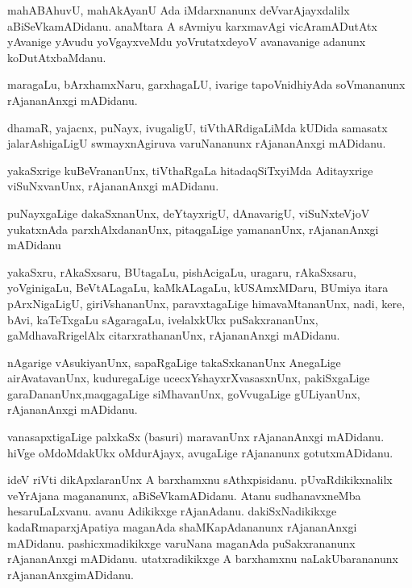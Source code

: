 \documentclass{article}
\begin{document}
\begin{mn}
mahABAhuvU, mahAkAyanU Ada iMdarxnanunx deVvarAjayxdalilx aBiSeVkamADidanu.  
anaMtara A sAvmiyu karxmavAgi vicAramADutAtx yAvanige yAvudu yoVgayxveMdu 
yoVrutatxdeyoV  avanavanige adanunx koDutAtxbaMdanu.
\end{mn}

\begin{mn}
maragaLu, bArxhamxNaru, garxhagaLU,  ivarige tapoVnidhiyAda soVmananunx rAjananAnxgi  mADidanu.
\end{mn}

\begin{mn}
dhamaR, yajacnx, puNayx, ivugaligU,  tiVthARdigaLiMda kUDida samasatx 
jalarAshigaLigU swmayxnAgiruva varuNananunx rAjananAnxgi mADidanu.
\end{mn}

\begin{mn}
yakaSxrige kuBeVrananUnx,  tiVthaRgaLa hitadaqSiTxyiMda  Aditayxrige viSuNxvanUnx, rAjananAnxgi mADidanu.
\end{mn}

\begin{mn}
puNayxgaLige dakaSxnanUnx, deYtayxrigU, dAnavarigU, viSuNxteVjoV yukatxnAda 
parxhAlxdananUnx, pitaqgaLige yamananUnx, rAjananAnxgi mADidanu
\end{mn}

\begin{mn}
yakaSxru, rAkaSxsaru, BUtagaLu, pishAcigaLu, uragaru, rAkaSxsaru, yoVginigaLu, 
BeVtALagaLu, kaMkALagaLu,  kUSAmxMDaru,  BUmiya itara pArxNigaLigU,  
giriVshananUnx, paravxtagaLige himavaMtananUnx, nadi, kere, bAvi, kaTeTxgaLu 
sAgaragaLu, ivelalxkUkx puSakxrananUnx, gaMdhavaRrigelAlx citarxrathananUnx, 
rAjananAnxgi mADidanu.
\end{mn}

\begin{mn}
nAgarige vAsukiyanUnx, sapaRgaLige takaSxkananUnx AnegaLige airAvatavanUnx, 
kuduregaLige ucecxYshayxrXvasasxnUnx, pakiSxgaLige garaDananUnx,maqgagaLige 
siMhavanUnx, goVvugaLige gULiyanUnx, rAjananAnxgi mADidanu.
\end{mn}

\begin{mn}
vanasapxtigaLige palxkaSx (basuri) maravanUnx rAjananAnxgi mADidanu. hiVge 
oMdoMdakUkx oMdurAjayx, avugaLige rAjananunx  gotutxmADidanu. 
\end{mn}

\begin{mn}
ideV riVti dikApxlaranUnx A barxhamxnu sAthxpisidanu. pUvaRdikikxnalilx 
veYrAjana magananunx, aBiSeVkamADidanu. Atanu sudhanavxneMba hesaruLaLxvanu. 
avanu Adikikxge rAjanAdanu. dakiSxNadikikxge kadaRmaparxjApatiya maganAda 
shaMKapAdananunx  rAjananAnxgi mADidanu.  pashicxmadikikxge varuNana maganAda 
puSakxrananunx rAjananAnxgi mADidanu. utatxradikikxge A barxhamxnu naLakUbarananunx rAjananAnxgimADidanu.
\end{mn}
\end{document}
